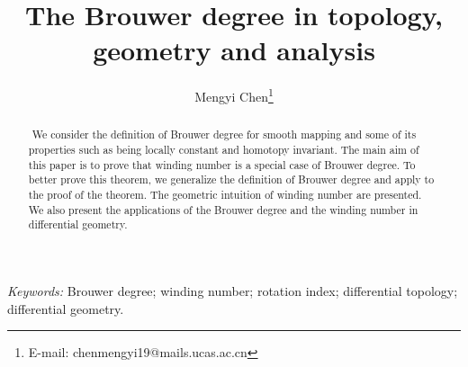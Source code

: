 \documentclass[11pt]{article}
\numberwithin{equation}{section} \numberwithin{theorem}{section}
\numberwithin{lemma}{section} \numberwithin{remark}{section}
\numberwithin{table}{section} \numberwithin{corollary}{section}
\numberwithin{example}{section} \numberwithin{conjecture}{section}
\numberwithin{assumption}{section}
\numberwithin{definition}{section}
\numberwithin{proposition}{section}
\begin{document}
\title{The Brouwer degree in topology, geometry and analysis}

\author[1]{Mengyi Chen\thanks{E-mail: chenmengyi19@mails.ucas.ac.cn}}

\maketitle
\begin{abstract}

​    We consider the definition of Brouwer degree for smooth mapping and some of its properties such as being locally constant and homotopy invariant. The main aim of this paper is to prove that winding number is a special case of Brouwer degree. To better prove this theorem, we generalize the definition of Brouwer degree and apply to the proof of the theorem. The geometric intuition of winding number are presented. 
​    We also present the applications of the Brouwer degree and the winding number in differential geometry.
\end{abstract}

\emph{Keywords:}
Brouwer degree; winding number; rotation index; differential topology; differential geometry.
\end{document}
